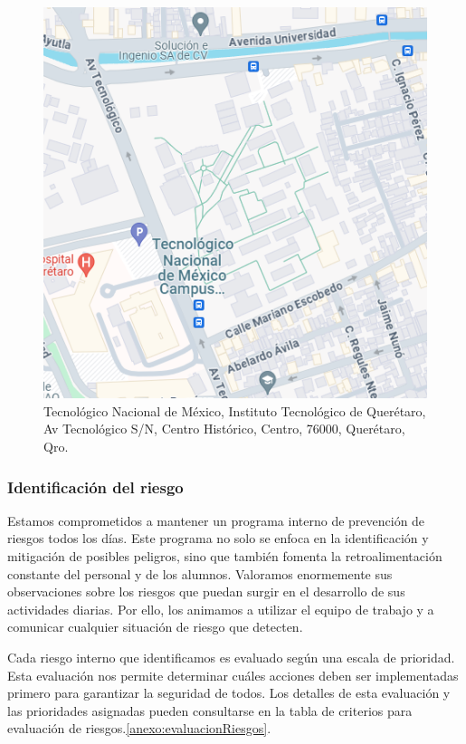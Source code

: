    \begin{figure}[H]
        \centering
        \includegraphics[scale=0.4]{35/Img/mapaITQ.png}
        \caption{Tecnológico Nacional de México, Instituto Tecnológico de Querétaro, Av Tecnológico S/N, Centro Histórico, Centro, 76000, Querétaro, Qro.}
        \label{fig:mapaITQ}
    \end{figure}
    
    \subsubsection{Identificación del riesgo}
    
    Estamos comprometidos a mantener un programa interno de prevención de riesgos todos los días. Este programa no solo se enfoca en la identificación y mitigación de posibles peligros, sino que también fomenta la retroalimentación constante del personal y de los alumnos. Valoramos enormemente sus observaciones sobre los riesgos que puedan surgir en el desarrollo de sus actividades diarias. Por ello, los animamos a utilizar el equipo de trabajo y a comunicar cualquier situación de riesgo que detecten.
    
    Cada riesgo interno que identificamos es evaluado según una escala de prioridad. Esta evaluación nos permite determinar cuáles acciones deben ser implementadas primero para garantizar la seguridad de todos. Los detalles de esta evaluación y las prioridades asignadas pueden consultarse en la tabla de criterios para evaluación de riesgos.\ref{anexo:evaluacionRiesgos}. 
    

